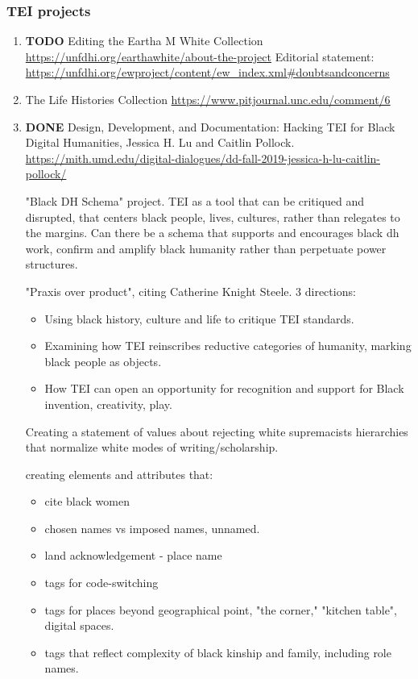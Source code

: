 \documentclass[11pt]{article}
\begin{document}
\subsubsection{TEI projects}
\label{sec:orgde17993}
\begin{enumerate}
\item {\bfseries\sffamily TODO} Editing the Eartha M White Collection
\label{sec:orgff37a1a}
\url{https://unfdhi.org/earthawhite/about-the-project} 
Editorial statement:
\url{https://unfdhi.org/ewproject/content/ew\_index.xml\#doubtsandconcerns}
\item The Life Histories Collection
\label{sec:org6af680e}
\url{https://www.pitjournal.unc.edu/comment/6} 

\item {\bfseries\sffamily DONE} Design, Development, and Documentation: Hacking TEI for Black
\label{sec:org514e0ae}
Digital Humanities, Jessica H. Lu and Caitlin Pollock.
\url{https://mith.umd.edu/digital-dialogues/dd-fall-2019-jessica-h-lu-caitlin-pollock/}

"Black DH Schema" project. TEI as a tool that can be critiqued and
disrupted, that centers black people, lives, cultures, rather than
relegates to the margins. Can there be a schema that supports and
encourages black dh work, confirm and amplify black humanity rather
than perpetuate power structures. 

"Praxis over product", citing Catherine Knight Steele. 
3 directions:
\begin{itemize}
\item Using black history, culture and life to critique TEI standards.
\item Examining how TEI reinscribes reductive categories of humanity,
marking black people as objects.
\item How TEI can open an opportunity for recognition and support for
Black invention, creativity, play.
\end{itemize}

Creating a statement of values about rejecting white supremacists
hierarchies that normalize white modes of writing/scholarship.

creating elements and attributes that:
\begin{itemize}
\item cite black women
\item chosen names vs imposed names, unnamed.
\item land acknowledgement - place name
\item tags for code-switching
\item tags for places beyond geographical point, "the corner," "kitchen
table", digital spaces.
\item tags that reflect complexity of black kinship and family, including
role names.
\end{itemize}


\end{enumerate}
\end{document}
